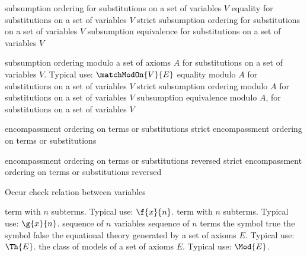          {subsumption ordering for substitutions on a set of variables $V$}
         {equality for substitutions on a set of variables $V$}
         {strict subsumption ordering for substitutions on a set of 
          variables $V$}
         {subsumption equivalence for substitutions on a set of variables $V$ }

         {subsumption ordering modulo a set of axioms $A$ for
          substitutions on a set of variables $V$.
          Typical use: $\matchModOn{V}{E}$ }
         {equality modulo $A$ for substitutions on a set of variables $V$}
         {strict subsumption ordering modulo $A$ for substitutions on a set of 
          variables $V$}
         {subsumption equivalence modulo $A$, for substitutions on a
          set of variables $V$} 

         {encompassment ordering on terms or substitutions}
         {strict encompassment ordering on terms or substitutions}

         {encompassment ordering on terms or substitutions reversed}
         {strict encompassment ordering on terms or substitutions reversed}

         {Occur check relation between variables}


         {term with $n$ subterms. Typical use: $\f{x}{n}$.}
         {term with $n$ subterms. Typical use: $\g{x}{n}$.}
         {sequence of $n$ variables}
         {sequence of $n$ terms}
          {the symbol true}
          {the symbol false}
          {the equational theory generated by a set of axioms $E$.
           Typical use: $\Th{E}$.}
          {the class of models of a set of axioms $E$.
           Typical use: $\Mod{E}$.}


